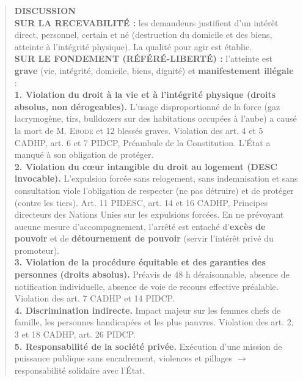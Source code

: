 \documentclass[11pt]{article}
\newcommand{\cle}[1]{{\popxbold\color{popdark}#1}}
\begin{document}
\begin{exoresolu}
\begin{quote}
\textbf{DISCUSSION}\\\vspace{0.1cm}
\textbf{SUR LA RECEVABILITÉ :} les demandeurs justifient d'un intérêt direct, personnel, certain et né (destruction du domicile et des biens, atteinte à l'intégrité physique). La qualité pour agir est établie.\\\vspace{0.1cm}
\textbf{SUR LE FONDEMENT (RÉFÉRÉ-LIBERTÉ) :} l'atteinte est \textbf{grave} (vie, intégrité, domicile, biens, dignité) et \textbf{manifestement illégale} :\\
\textbf{1. Violation du droit à la vie et à l'intégrité physique (droits absolus, non dérogeables).} L'usage disproportionné de la force (gaz lacrymogène, tirs, bulldozers sur des habitations occupées à l'aube) a causé la mort de M. \textsc{Ebode} et 12 blessés graves. Violation des art. 4 et 5 CADHP, art. 6 et 7 PIDCP, Préambule de la Constitution. L'État a manqué à son obligation de \cle{protéger}.\\
\textbf{2. Violation du cœur intangible du droit au logement (DESC invocable).} L'expulsion forcée sans relogement, sans indemnisation et sans consultation viole l'obligation de \cle{respecter} (ne pas détruire) et de \cle{protéger} (contre les tiers). Art. 11 PIDESC, art. 14 et 16 CADHP, Principes directeurs des Nations Unies sur les expulsions forcées. En ne prévoyant aucune mesure d'accompagnement, l'arrêté est entaché d'\textbf{excès de pouvoir} et de \textbf{détournement de pouvoir} (servir l'intérêt privé du promoteur).\\
\textbf{3. Violation de la procédure équitable et des garanties des personnes (droits absolus).} Préavis de 48 h déraisonnable, absence de notification individuelle, absence de voie de recours effective préalable. Violation des art. 7 CADHP et 14 PIDCP.\\
\textbf{4. Discrimination indirecte.} Impact majeur sur les femmes chefs de famille, les personnes handicapées et les plus pauvres. Violation des art. 2, 3 et 18 CADHP, art. 26 PIDCP.\\
\textbf{5. Responsabilité de la société privée.} Exécution d'une mission de puissance publique sans encadrement, violences et pillages $\rightarrow$ responsabilité solidaire avec l'État.\\\vspace{0.3cm}


\end{quote}
\end{exoresolu}
\end{document}
